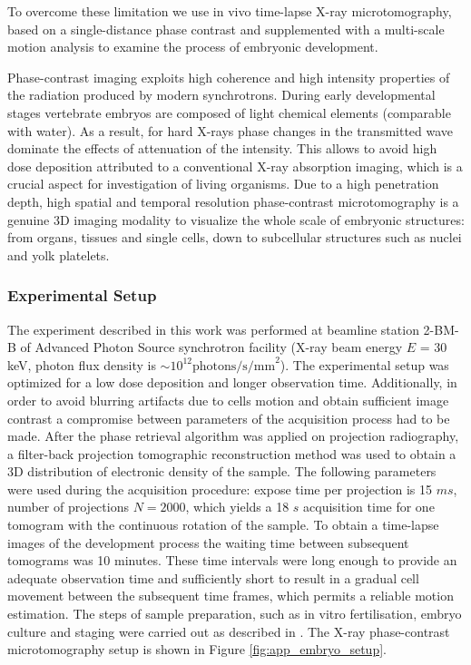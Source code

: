 To overcome these limitation we use in vivo time-lapse X-ray microtomography, based on a single-distance phase contrast and supplemented with a multi-scale motion analysis to examine the process of embryonic development. 

Phase-contrast imaging exploits high coherence and high intensity properties of the radiation produced by modern synchrotrons. During early developmental stages vertebrate embryos are composed of
light chemical elements (comparable with water). As a result, for hard X-rays phase changes in the transmitted wave dominate the effects of attenuation of the intensity. This allows to avoid high dose deposition attributed to a conventional X-ray absorption imaging, which is a crucial aspect for investigation of living organisms. Due to a high
penetration depth, high spatial and temporal resolution phase-contrast microtomography is a genuine 3D imaging modality to visualize the whole scale of embryonic structures: from organs, tissues and single cells, down to subcellular structures such as nuclei and yolk platelets.



\subsubsection{Experimental Setup}

The experiment described in this work was performed at beamline station 2-BM-B of Advanced Photon Source synchrotron facility (X-ray beam energy $E$ = 30 keV, photon flux density is $ \sim 10^{12}  \text{photons/s/mm}^2$). The experimental setup was optimized for a low dose deposition and longer observation time. Additionally, in order to avoid blurring artifacts due to cells motion and obtain sufficient image contrast a compromise between parameters of the acquisition process had to be made. After the phase retrieval algorithm was applied on projection radiography, a filter-back projection tomographic reconstruction method was used to obtain a 3D distribution of electronic density of the sample. The following parameters were used during the acquisition procedure: expose time per projection is 15 $ms$, number of projections $N=2000$, which yields a 18 $s$ acquisition time for one tomogram with the continuous rotation of the sample. To obtain a time-lapse images of the development process the waiting time between subsequent tomograms was 10 minutes. These time intervals were long enough to provide an adequate observation time and sufficiently short to result in a gradual cell movement between the subsequent time frames, which permits a reliable motion estimation. The steps of sample preparation, such as in vitro fertilisation, embryo culture and staging were carried out as described in \cite{Kashef09}. The X-ray phase-contrast microtomography setup is shown in Figure \ref{fig:app_embryo_setup}. 


